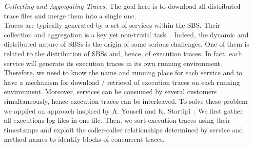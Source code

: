 \vspace{.20cm}
\noindent \emph{Collecting and Aggregating Traces.} The goal here is to download all distributed trace files and merge them into a single one.
\vspace{.15cm}
\\
\noindent Traces are typically generated by a set of services within the SBS. Their collection and aggregation is a key yet non-trivial task~\cite{Wilde2008}. Indeed, the dynamic and distributed nature of SBSs is the origin of some serious challenges. One of them is related to the distribution of SBSs and, hence, of execution traces. In fact, each  service will generate its execution traces in its own running environment. Therefore, we need to know the name and running place for each service and to have a mechanism for download / retrieval of execution traces on each running environment. Moreover, services can be consumed by several customers simultaneously, hence execution traces can be interleaved. To solve these problem we applied an approach inspired by A. Yousefi and K. Startipi~\cite{Yousefi2011}: We first gather all executions log files in one file. Then, we sort execution traces using their  timestamps and exploit the caller-callee relationships determined by service and method names to identify blocks of concurrent traces.

